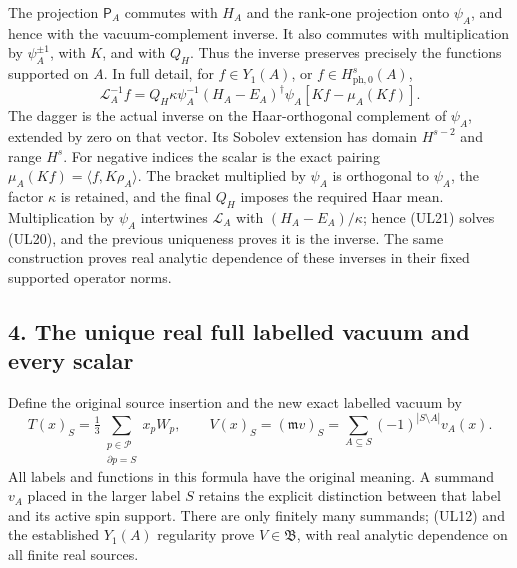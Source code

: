 \documentclass[11pt]{article}
\begin{document}
The projection \(\mathsf P_A\) commutes with \(H_A\) and the rank-one projection onto \(\psi_A\), and hence with the vacuum-complement inverse. It also commutes with multiplication by \(\psi_A^{\pm1}\), with \(K\), and with \(Q_H\). Thus the inverse preserves precisely the functions supported on \(A\). In full detail, for \(f\in Y_1(A)\), or \(f\in H^s_{\mathrm{ph},0}(A)\),
\[
 \boxed{\mathscr L_A^{-1}f
 =Q_H\kappa\psi_A^{-1}(H_A-E_A)^\dagger\psi_A
                     [Kf-\mu_A(Kf)].}
 \tag{UL21}
\]
The dagger is the actual inverse on the Haar-orthogonal complement of \(\psi_A\), extended by zero on that vector. Its Sobolev extension has domain \(H^{s-2}\) and range \(H^s\). For negative indices the scalar is the exact pairing \(\mu_A(Kf)=\langle f,K\rho_A\rangle\). The bracket multiplied by \(\psi_A\) is orthogonal to \(\psi_A\), the factor \(\kappa\) is retained, and the final \(Q_H\) imposes the required Haar mean. Multiplication by \(\psi_A\) intertwines \(\mathcal L_A\) with \((H_A-E_A)/\kappa\); hence (UL21) solves (UL20), and the previous uniqueness proves it is the inverse. The same construction proves real analytic dependence of these inverses in their fixed supported operator norms.

\subsection*{4. The unique real full labelled vacuum and every scalar}

Define the original source insertion and the new exact labelled vacuum by
\[
 T(x)_S=\tfrac13\sum_{\substack{p\in\mathcal P\\\partial p=S}}x_pW_p,
 \qquad
 V(x)_S=(\mathfrak m v)_S
       =\sum_{A\subseteq S}(-1)^{|S\setminus A|}v_A(x).
 \tag{UL22}
\]
All labels and functions in this formula have the original meaning. A summand \(v_A\) placed in the larger label \(S\) retains the explicit distinction between that label and its active spin support. There are only finitely many summands; (UL12) and the established \(Y_1(A)\) regularity prove \(V\in\mathfrak B\), with real analytic dependence on all finite real sources.
\end{document}
